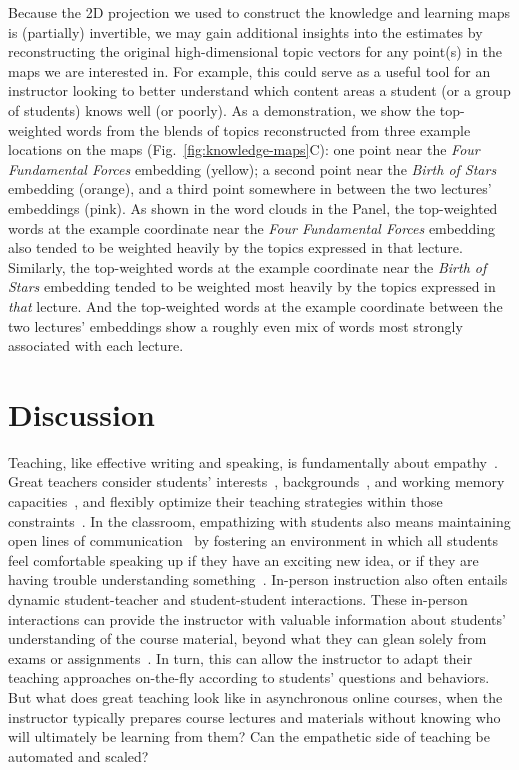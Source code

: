 \documentclass[10pt]{article}
\begin{document}
Because the 2D projection we used to construct the knowledge and learning maps
is (partially) invertible, we may gain additional insights into the estimates
by reconstructing the original high-dimensional topic vectors for any point(s)
in the maps we are interested in. For example, this could serve as a useful
tool for an instructor looking to better understand which content areas a
student (or a group of students) knows well (or poorly). As a demonstration, we
show the top-weighted words from the blends of topics reconstructed from three
example locations on the maps (Fig.~\ref{fig:knowledge-maps}C): one point near
the \textit{Four Fundamental Forces} embedding (yellow); a second point near
the \textit{Birth of Stars} embedding (orange), and a third point somewhere in
between the two lectures' embeddings (pink). As shown in the word clouds in the
Panel, the top-weighted words at the example coordinate near the \textit{Four
Fundamental Forces} embedding also tended to be weighted heavily by the topics
expressed in that lecture. Similarly, the top-weighted words at the example
coordinate near the \textit{Birth of Stars} embedding tended to be weighted
most heavily by the topics expressed in \textit{that} lecture. And the
top-weighted words at the example coordinate between the two lectures'
embeddings show a roughly even mix of words most strongly associated with each
lecture.

\section*{Discussion}

Teaching, like effective writing and speaking, is fundamentally about
empathy~\citep{AldrEtal22, StojEtal12, MeyeEtal19}. Great teachers consider
students' interests~\citep{SwarEtal12, Clar10}, backgrounds~\citep{MuijReyn10,
Rose76, denBEtal10}, and working memory capacities~\citep{Allo12}, and flexibly
optimize their teaching strategies within those constraints~\citep{GoodEtal07,
AndeEtal21, John02}. In the classroom, empathizing with students also means
maintaining open lines of communication~\citep{WulfWulf10} by fostering an
environment in which all students feel comfortable speaking up if they have an
exciting new idea, or if they are having trouble understanding
something~\citep{TurnBrai15, GarrRasm14}. In-person instruction also often
entails dynamic student-teacher and student-student interactions. These
in-person interactions can provide the instructor with valuable information
about students' understanding of the course material, beyond what they can
glean solely from exams or assignments~\citep{Engl09, vandEtal10c, HallWals02}.
In turn, this can allow the instructor to adapt their teaching approaches
on-the-fly according to students' questions and behaviors. But what does great
teaching look like in asynchronous online courses, when the instructor
typically prepares course lectures and materials without knowing who will
ultimately be learning from them? Can the empathetic side of teaching be
automated and scaled?
\end{document}
